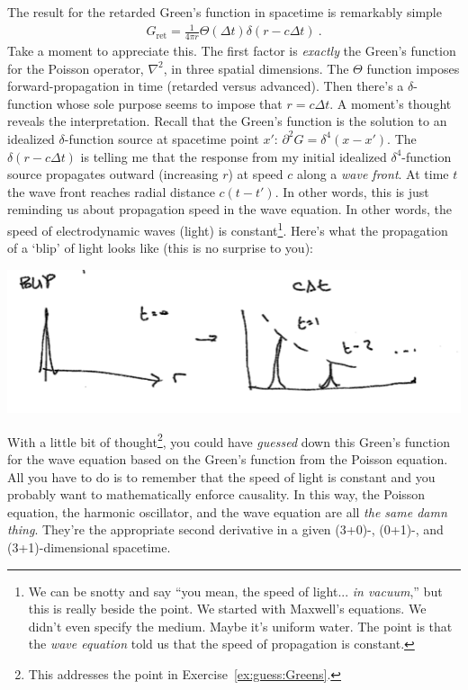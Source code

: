 \documentclass[
  11pt,
	colorful,
	raggedright,
]{tufte-style-thesis-flip}
\begin{document}
The result for the retarded Green's function in spacetime is remarkably simple
\begin{align}
  G_\text{ret} = \frac{1}{4\pi r} \Theta(\Delta t) \delta(r-c\Delta t) \ .
\end{align}
Take a moment to appreciate this. The first factor is \emph{exactly} the Green's function for the Poisson operator, $\nabla^2$, in three spatial dimensions. The $\Theta$ function imposes forward-propagation in time (retarded versus advanced). Then there's a $\delta$-function whose sole purpose seems to impose that $r = c\Delta t$. A moment's thought reveals the interpretation. Recall that the Green's function is the solution to an idealized $\delta$-function source at spacetime point $x'$: $\partial^2 G = \delta^4(x-x')$. The $\delta(r-c\Delta t)$ is telling me that the response from my initial idealized $\delta^4$-function source propagates outward (increasing $r$) at speed $c$ along a \emph{wave front}. At time $t$ the wave front reaches radial distance $c(t-t')$. In other words, this is just reminding us about propagation speed in the wave equation. In other words, the speed of electrodynamic waves (light) is constant\footnote{We can be snotty and say ``you mean, the speed of light... \emph{in vacuum},'' but this is really beside the point. We started with Maxwell's equations. We didn't even specify the medium. Maybe it's uniform water. The point is that the \emph{wave equation} told us that the speed of propagation is constant.}. Here's what the propagation of a `blip' of light looks like (this is no surprise to you):
\begin{center}
\includegraphics[width=.9\textwidth]{figures/Lec27_3dblip.png}
\end{center}

With a little bit of thought\footnote{This addresses the point in Exercise~\ref{ex:guess:Greens}.}, you could have \emph{guessed} down this Green's function for the wave equation based on the Green's function from the Poisson equation. All you have to do is to remember that the speed of light is constant and you probably want to mathematically enforce causality. In this way, the Poisson equation, the harmonic oscillator, and the wave equation are all \emph{the same damn thing}. They're the appropriate second derivative in a given (3+0)-, (0+1)-, and (3+1)-dimensional spacetime.
\end{document}
